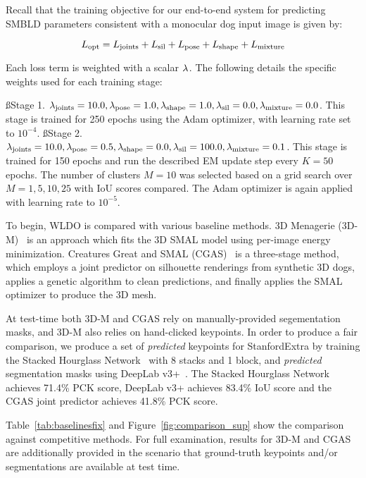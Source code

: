 Recall that the training objective for our end-to-end system for predicting SMBLD parameters consistent with a monocular dog input image is given by:

\begin{equation}
    L_{\textrm{opt}}=L_{\textrm{joints}}+L_{\textrm{sil}}+L_{\textrm{pose}}+L_{\textrm{shape}}+L_{\textrm{mixture}}
\end{equation}

Each loss term is weighted with a scalar $\lambda_\textrm{}$. The following details the specific weights used for each training stage:

\ss{Stage 1.} $\lambda_\textrm{joints}=10.0,\lambda_\textrm{pose}=1.0,\lambda_\textrm{shape}=1.0,\lambda_\textrm{sil}=0.0,\lambda_\textrm{mixture}=0.0$. This stage is trained for 250 epochs using the Adam optimizer, with learning rate set to $10^{-4}$. 
\ss{Stage 2.} $\lambda_\textrm{joints}=10.0,\lambda_\textrm{pose}=0.5,\lambda_\textrm{shape}=0.0,\lambda_\textrm{sil}=100.0,\lambda_\textrm{mixture}=0.1$. This stage is trained for 150 epochs and run the described EM update step every $K=50$ epochs. The number of clusters $M=10$ was selected based on a grid search over $M=1,5,10,25$ with IoU scores compared. The Adam optimizer is again applied with learning rate to $10^{-5}$.

To begin, WLDO is compared with various baseline methods. 3D Menagerie (3D-M)~\cite{DBLP:journals/corr/ZuffiKJB16} is an approach which fits the 3D SMAL model using per-image energy minimization. Creatures Great and SMAL (CGAS)~\cite{biggs2018creatures} is a three-stage method, which employs a joint predictor on silhouette renderings from synthetic 3D dogs, applies a genetic algorithm to clean predictions, and finally applies the SMAL optimizer to produce the 3D mesh.

At test-time both 3D-M and CGAS rely on manually-provided segementation masks, and 3D-M also relies on hand-clicked keypoints. In order to produce a fair comparison, we produce a set of \emph{predicted} keypoints for StanfordExtra by training the Stacked Hourglass Network~\cite{newell2016stacked} with 8 stacks and 1 block, and \emph{predicted} segmentation masks using DeepLab v3+~\cite{journals/corr/ChenPK0Y16}. The Stacked Hourglass Network achieves 71.4\% PCK score, DeepLab v3+ achieves 83.4\% IoU score and the CGAS joint predictor achieves 41.8\% PCK score. 


% 
% 

Table~\ref{tab:baselinesfix} and Figure~\ref{fig:comparison_sup} show the comparison against competitive methods. For full examination, results for 3D-M and CGAS are additionally provided in the scenario that ground-truth keypoints and/or segmentations are available at test time. 

